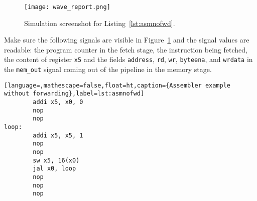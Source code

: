 \documentclass[11pt,a4paper,titlepage,oneside]{article}
\begin{document}
\maketitle


\begin{figure}[ht!]
  \centering
  \texttt{[image: wave\_report.png]}
  \caption{Simulation screenshot for Listing~\ref{lst:asmnofwd}.}
  \label{fig:sim}
\end{figure}

Make sure the following signals are visible in Figure~\ref{fig:sim} and the 
signal values are readable:
the program counter in the fetch stage, the instruction being fetched, the 
content of register \texttt{x5} and the fields \texttt{address}, \texttt{rd}, 
\texttt{wr}, \texttt{byteena}, and \texttt{wrdata} in the \texttt{mem\_out} 
signal coming out of the pipeline in the memory stage.

\begin{lstlisting}[language=,mathescape=false,float=ht,caption={Assembler example without forwarding},label=lst:asmnofwd]
        addi x5, x0, 0
        nop
        nop
loop:
        addi x5, x5, 1
        nop
        nop
        sw x5, 16(x0)
        jal x0, loop
        nop
        nop
        nop
\end{lstlisting}
\end{document}
